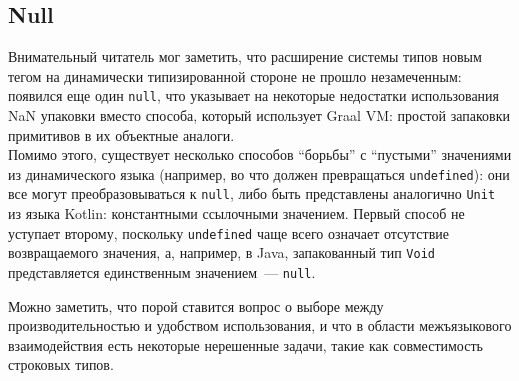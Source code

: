\documentclass[times,specification,annotation]{itmo-student-thesis}
\begin{document}
\subsection{Null}
Внимательный читатель мог заметить, что расширение системы типов новым тегом на динамически типизированной стороне не прошло незамеченным: появился еще один \texttt{null}, что указывает на некоторые недостатки использования NaN упаковки вместо способа, который использует Graal VM: простой запаковки примитивов в их объектные аналоги.\\
Помимо этого, существует несколько способов ``борьбы'' с ``пустыми'' значениями из динамического языка (например, во что должен превращаться \texttt{undefined}): они все могут преобразовываться к \texttt{null}, либо быть представлены аналогично \texttt{Unit} из языка Kotlin: константными ссылочными значением. Первый способ не уступает второму, поскольку \texttt{undefined} чаще всего означает отсутствие возвращаемого значения, а, например, в Java, запакованный тип \texttt{Void} представляется единственным значением~--- \texttt{null}.

\chapterconclusion
\TODO
Можно заметить, что порой ставится вопрос о выборе между производительностью и удобством использования, и что в области межъязыкового взаимодействия есть некоторые нерешенные задачи, такие как совместимость строковых типов.
\end{document}

